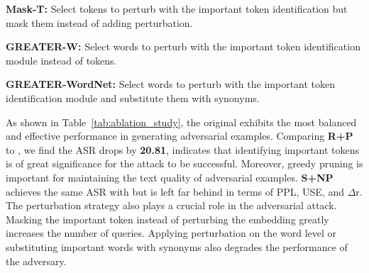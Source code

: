 \noindent\textbf{Mask-T:} Select tokens to perturb with the important token identification but mask them instead of adding perturbation.

\noindent\textbf{GREATER-W:} Select words to perturb with the important token identification module instead of tokens.

\noindent\textbf{GREATER-WordNet:} Select words to perturb with the important token identification module and substitute them with synonyms.

As shown in Table~\ref{tab:ablation_study}, the original \attackname exhibits the most balanced and effective performance in generating adversarial examples.
Comparing \textbf{R+P} to \attackname, we find the ASR drops by \textbf{20.81}, indicates that identifying important tokens is of great significance for the attack to be successful.
Moreover, greedy pruning is important for maintaining the text quality of adversarial examples.
\textbf{S+NP} achieves the same ASR with \attackname but is left far behind in terms of PPL, USE, and $\Delta$r.
The perturbation strategy also plays a crucial role in the adversarial attack.
Masking the important token instead of perturbing the embedding greatly increases the number of queries.
Applying perturbation on the word level or substituting important words with synonyms also degrades the performance of the adversary.

